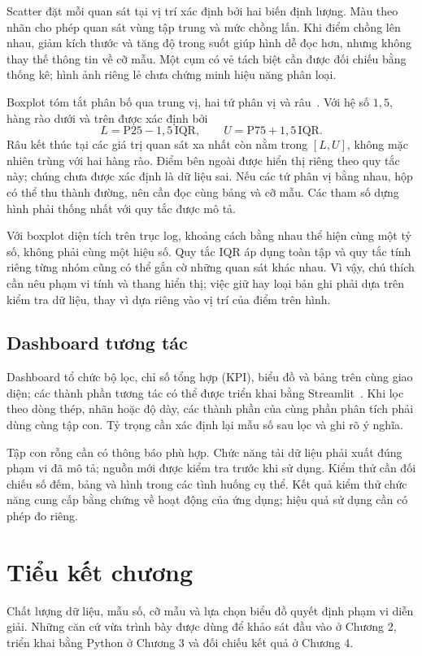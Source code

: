 Scatter đặt mỗi quan sát tại vị trí xác định bởi hai biến định lượng. Màu theo nhãn cho phép quan sát vùng tập trung và mức chồng lấn. Khi điểm chồng lên nhau, giảm kích thước và tăng độ trong suốt giúp hình dễ đọc hơn, nhưng không thay thế thông tin về cỡ mẫu. Một cụm có vẻ tách biệt cần được đối chiếu bằng thống kê; hình ảnh riêng lẻ chưa chứng minh hiệu năng phân loại.

Boxplot tóm tắt phân bố qua trung vị, hai tứ phân vị và râu~\cite{nistbox}. Với hệ số $1{,}5$, hàng rào dưới và trên được xác định bởi
\begin{equation}
  L=\mathrm{P25}-1{,}5\,\mathrm{IQR},
  \qquad
  U=\mathrm{P75}+1{,}5\,\mathrm{IQR}.
  \label{eq:hangraoiqr}
\end{equation}
Râu kết thúc tại các giá trị quan sát xa nhất còn nằm trong $[L,U]$, không mặc nhiên trùng với hai hàng rào. Điểm bên ngoài được hiển thị riêng theo quy tắc này; chúng chưa được xác định là dữ liệu sai. Nếu các tứ phân vị bằng nhau, hộp có thể thu thành đường, nên cần đọc cùng bảng và cỡ mẫu. Các tham số dựng hình phải thống nhất với quy tắc được mô tả.

Với boxplot diện tích trên trục log, khoảng cách bằng nhau thể hiện cùng một tỷ số, không phải cùng một hiệu số. Quy tắc IQR áp dụng toàn tập và quy tắc tính riêng từng nhóm cũng có thể gắn cờ những quan sát khác nhau. Vì vậy, chú thích cần nêu phạm vi tính và thang hiển thị; việc giữ hay loại bản ghi phải dựa trên kiểm tra dữ liệu, thay vì dựa riêng vào vị trí của điểm trên hình.

\subsection{Dashboard tương tác}

Dashboard tổ chức bộ lọc, chỉ số tổng hợp (KPI), biểu đồ và bảng trên cùng giao diện; các thành phần tương tác có thể được triển khai bằng Streamlit~\cite{streamlit}. Khi lọc theo dòng thép, nhãn hoặc độ dày, các thành phần của cùng phần phân tích phải dùng cùng tập con. Tỷ trọng cần xác định lại mẫu số sau lọc và ghi rõ ý nghĩa.

Tập con rỗng cần có thông báo phù hợp. Chức năng tải dữ liệu phải xuất đúng phạm vi đã mô tả; nguồn mới được kiểm tra trước khi sử dụng. Kiểm thử cần đối chiếu số đếm, bảng và hình trong các tình huống cụ thể. Kết quả kiểm thử chức năng cung cấp bằng chứng về hoạt động của ứng dụng; hiệu quả sử dụng cần có phép đo riêng.

\section{Tiểu kết chương}

Chất lượng dữ liệu, mẫu số, cỡ mẫu và lựa chọn biểu đồ quyết định phạm vi diễn giải. Những căn cứ vừa trình bày được dùng để khảo sát đầu vào ở Chương 2, triển khai bằng Python ở Chương 3 và đối chiếu kết quả ở Chương 4.
